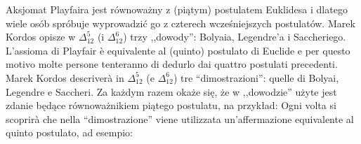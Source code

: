 Aksjomat Playfaira jest równoważny z (piątym) postulatem Euklidesa i dlatego wiele osób spróbuje wyprowadzić go z czterech wcześniejszych postulatów. %
Marek Kordos opisze w $\Delta_{12}^5$ (i $\Delta_{12}^6$) trzy ,,dowody'': Bolyaia, Legendre'a i Saccheriego. %
L'assioma di Playfair è equivalente al (quinto) postulato di Euclide e per questo motivo molte persone tenteranno di dedurlo dai quattro postulati precedenti. %
Marek Kordos descriverà in $\Delta_{12}^5$ (e $\Delta_{12}^6$) tre ``dimostrazioni'': quelle di Bolyai, Legendre e Saccheri. %
%
%
%
Za każdym razem okaże się, że w ,,dowodzie'' użyte jest zdanie będące równoważnikiem piątego postulatu, na przykład: %
Ogni volta si scoprirà che nella ``dimostrazione'' viene utilizzata un'affermazione equivalente al quinto postulato, ad esempio: %
